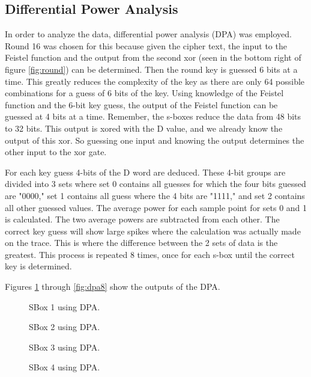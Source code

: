 \subsection{Differential Power Analysis}
	In order to analyze the data, differential power analysis (DPA) was employed.  Round 16 was chosen for this because given the cipher text, the input to the Feistel function and the output from the second xor (seen in the bottom right of figure \ref{fig:round}) can be determined.  Then the round key is guessed 6 bits at a time.  This greatly reduces the complexity of the key as there are only 64 possible combinations for a guess of 6 bits of the key.  Using knowledge of the Feistel function and the 6-bit key guess, the output of the Feistel function can be guessed at 4 bits at a time.  Remember, the s-boxes reduce the data from 48 bits to 32 bits.  This output is xored with the D value, and we already know the output of this xor.  So guessing one input and knowing the output determines the other input to the xor gate.  

	For each key guess 4-bits of the D word are deduced.  These 4-bit groups are divided into 3 sets where set 0 contains all guesses for which the four bits guessed are "0000," set 1 contains all guess where the 4 bits are "1111," and set 2 contains all other guessed values.  The average power for each sample point for sets 0 and 1 is calculated.  The two average powers are subtracted from each other.  The correct key guess will show large spikes where the calculation was actually made on the trace.  This is where the difference between the 2 sets of data is the greatest.  This process is repeated 8 times, once for each s-box until the correct key is determined.

  Figures \ref{fig:dpa1} through \ref{fig:dpa8} show the outputs of the DPA.
  
  \begin{figure}[h]
  
  \caption{SBox 1 using DPA.}
	\label{fig:dpa1}
  \end{figure}
  
  \begin{figure}[h]
  
  \caption{SBox 2 using DPA.}
	\label{fig:dpa2}
  \end{figure}
  
  \begin{figure}[h]
  
  \caption{SBox 3 using DPA.}
	\label{fig:dpa3}
  \end{figure}
  
  \begin{figure}[h]
  
  \caption{SBox 4 using DPA.}
	\label{fig:dpa4}
  \end{figure}
  
